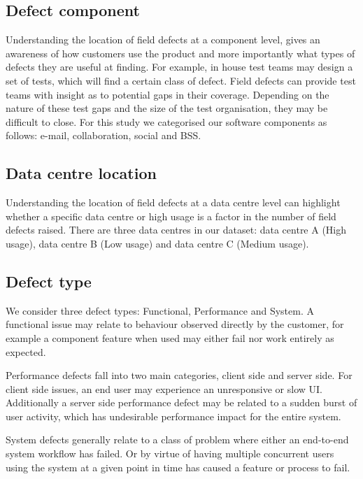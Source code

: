 \subsection{Defect component}

Understanding the location of field defects at a component level, gives an awareness of how customers use the product and more importantly what types of defects they are useful at finding. For example, in house test teams may design a set of tests, which will find a certain class of defect. Field defects can provide test teams with insight as to potential gaps in their coverage. Depending on the nature of these test gaps and the size of the test organisation, they may be difficult to close. For this study we categorised our software components as follows: e-mail, collaboration, social and BSS.

\subsection{Data centre location}

Understanding the location of field defects at a data centre level can highlight whether a specific data centre or high usage is a factor in the number of field defects raised. There are three data centres in our dataset: data centre A (High usage), data centre B (Low usage) and data centre C (Medium usage).

\subsection{Defect type}

We consider three defect types: Functional, Performance and System. A functional issue may relate to behaviour observed directly by the customer, for example a component feature when used may either fail nor work entirely as expected. 

Performance defects fall into two main categories, client side and server side. For client side issues, an end user may experience an unresponsive or slow UI. Additionally a server side performance defect may be related to a sudden burst of user activity, which has undesirable performance impact for the entire system.

System defects generally relate to a class of problem where either an end-to-end system workflow has failed. Or by virtue of having multiple concurrent users using the system at a given point in time has caused a feature or process to fail.

